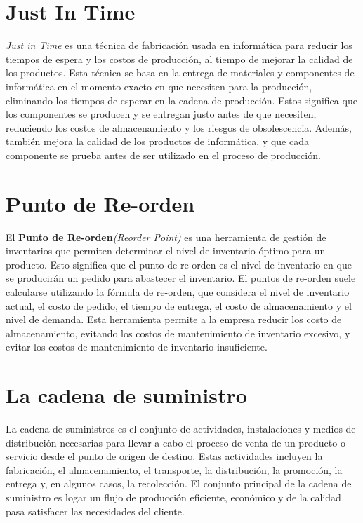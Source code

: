 \documentclass[12pt]{article}
\begin{document}
\section{Just In Time}
\textit{Just in Time} es una técnica de fabricación usada en informática para reducir los tiempos de espera y los costos de producción, al tiempo de mejorar la calidad de los productos. Esta técnica se basa en la entrega de materiales y componentes de informática en el momento exacto en que necesiten para la producción, eliminando los tiempos de esperar en la cadena de producción. Estos significa que los componentes se producen y se entregan justo antes de que necesiten, reduciendo los costos de almacenamiento y los riesgos de obsolescencia. Además, también mejora la calidad de los productos de informática, y que cada componente se prueba antes de ser utilizado en el proceso de producción.

\section{Punto de Re-orden}
El \textbf{Punto de Re-orden}\textit{(Reorder Point)} es una herramienta de gestión de inventarios que permiten determinar el nivel de inventario óptimo para un producto. Esto significa que el punto de re-orden es el nivel de inventario en que se producirán un pedido para abastecer el inventario. El puntos de re-orden suele calcularse utilizando la fórmula de re-orden, que considera el nivel de inventario actual, el costo de pedido, el tiempo de entrega, el costo de almacenamiento y el nivel de demanda. Esta herramienta permite a la empresa reducir los costo de almacenamiento, evitando los costos de mantenimiento de inventario excesivo, y evitar los costos de mantenimiento de inventario insuficiente.

\section{La cadena de suministro}
La cadena de suministros es el conjunto de actividades, instalaciones y medios de distribución necesarias para llevar a cabo el proceso de venta de un producto o servicio desde el punto de origen de destino. Estas actividades incluyen la fabricación, el almacenamiento, el transporte, la distribución, la promoción, la entrega y, en algunos casos, la recolección. El conjunto principal de la cadena de suministro es logar un flujo de producción eficiente, económico y de la calidad pasa satisfacer las necesidades del cliente.
\end{document}
